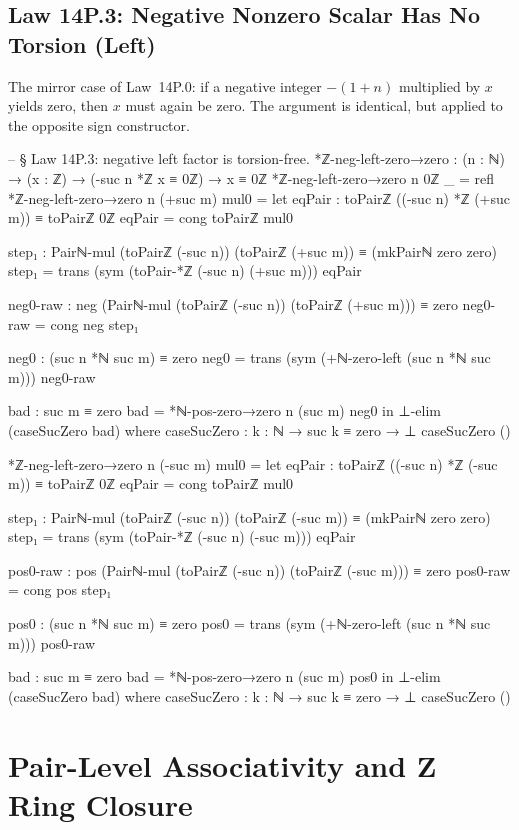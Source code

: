 \documentclass[11pt,a4paper]{book}
\def\mathbb#1{#1}%
\def\texorpdfstring#1#2{#2}%
\begin{document}
\subsection{Law 14P.3: Negative Nonzero Scalar Has No Torsion (Left)}

The mirror case of Law~14P.0: if a negative integer $-(1+n)$ multiplied by $x$ yields zero, then $x$ must again be zero.
The argument is identical, but applied to the opposite sign constructor.

\begin{code}
-- § Law 14P.3: negative left factor is torsion-free.
*ℤ-neg-left-zero→zero : (n : ℕ) → (x : ℤ) → (-suc n *ℤ x ≡ 0ℤ) → x ≡ 0ℤ
*ℤ-neg-left-zero→zero n 0ℤ _ = refl
*ℤ-neg-left-zero→zero n (+suc m) mul0 =
  let
    eqPair : toPairℤ ((-suc n) *ℤ (+suc m)) ≡ toPairℤ 0ℤ
    eqPair = cong toPairℤ mul0

    step₁ : Pairℕ-mul (toPairℤ (-suc n)) (toPairℤ (+suc m)) ≡ (mkPairℕ zero zero)
    step₁ = trans (sym (toPair-*ℤ (-suc n) (+suc m))) eqPair

    neg0-raw : neg (Pairℕ-mul (toPairℤ (-suc n)) (toPairℤ (+suc m))) ≡ zero
    neg0-raw = cong neg step₁

    neg0 : (suc n *ℕ suc m) ≡ zero
    neg0 =
      trans
        (sym (+ℕ-zero-left (suc n *ℕ suc m)))
        neg0-raw

    bad : suc m ≡ zero
    bad = *ℕ-pos-zero→zero n (suc m) neg0
  in
  ⊥-elim (caseSucZero bad)
  where
    caseSucZero : {k : ℕ} → suc k ≡ zero → ⊥
    caseSucZero ()

*ℤ-neg-left-zero→zero n (-suc m) mul0 =
  let
    eqPair : toPairℤ ((-suc n) *ℤ (-suc m)) ≡ toPairℤ 0ℤ
    eqPair = cong toPairℤ mul0

    step₁ : Pairℕ-mul (toPairℤ (-suc n)) (toPairℤ (-suc m)) ≡ (mkPairℕ zero zero)
    step₁ = trans (sym (toPair-*ℤ (-suc n) (-suc m))) eqPair

    pos0-raw : pos (Pairℕ-mul (toPairℤ (-suc n)) (toPairℤ (-suc m))) ≡ zero
    pos0-raw = cong pos step₁

    pos0 : (suc n *ℕ suc m) ≡ zero
    pos0 =
      trans
        (sym (+ℕ-zero-left (suc n *ℕ suc m)))
        pos0-raw

    bad : suc m ≡ zero
    bad = *ℕ-pos-zero→zero n (suc m) pos0
  in
  ⊥-elim (caseSucZero bad)
  where
    caseSucZero : {k : ℕ} → suc k ≡ zero → ⊥
    caseSucZero ()
\end{code}

\section{Pair-Level Associativity and \texorpdfstring{$\mathbb{Z}$}{Z} Ring Closure}
\end{document}
